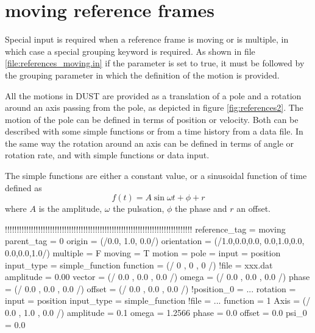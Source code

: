 \section{moving reference frames}
Special input is required when a reference frame is moving or is multiple, 
in which case a special grouping keyword is required. 
As shown in file \ref{file:references_moving.in} if the parameter  
is set to true, it must be followed by the grouping parameter  
in which the definition of the motion is provided. 

All the motions in DUST are provided as a translation of a pole and a 
rotation around an axis passing from the pole, as depicted in figure 
\ref{fig:references2}. The motion of the pole can be defined in terms 
of position or velocity. Both can be described with some simple functions 
or from a time history from a data file.
In the same way the rotation around an axis can be defined in terms 
of angle or rotation rate, and with simple functions or data input.

The simple functions are either a constant value, or a sinusoidal function 
of time defined as
\begin{equation}
f(t) = A \sin{\omega t + \phi} + r 
\end{equation}
where $A$ is the amplitude, $\omega$ the pulsation, $\phi$ the phase and $r$ an offset. 

\begin{inputfile}[frame=single, caption={references\_moving.in}, 
    label={file:references_moving.in}]
!!!!!!!!!!!!!!!!!!!!!!!!!!!!!!!!!!!!!!!!!!!!!!!!!!!!!!!!!!!!!!!!!!!!!!!!!!!!!!!
reference_tag = moving
parent_tag = 0
origin = (/0.0, 1.0, 0.0/)
orientation = (/1.0,0.0,0.0, 0.0,1.0,0.0, 0.0,0.0,1.0/)
multiple = F
moving = T
motion = {
  pole = {
    input      = position                           
    input_type = simple_function
    function   = (/  0  ,  0  ,  0  /)
    !file       = xxx.dat
    amplitude  = 0.00
    vector     = (/ 0.0 , 0.0 , 0.0 /)
    omega      = (/ 0.0 , 0.0 , 0.0 /)
    phase      = (/ 0.0 , 0.0 , 0.0 /)
    offset     = (/ 0.0 , 0.0 , 0.0 /)
    !position_0 = ...
  }
  rotation   = {
    input      = position
    input_type = simple_function
    !file = ...
    function   =  1      
    Axis       = (/ 0.0 , 1.0 , 0.0 /)  
    amplitude  = 0.1    
    omega      = 1.2566  
    phase      = 0.0  
    offset     = 0.0  
    psi_0      = 0.0           
  }
}
\end{inputfile}

